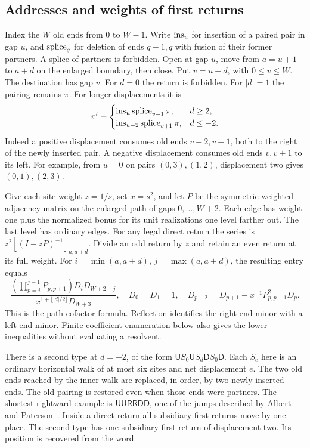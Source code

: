 \documentclass[11pt]{article}
\newcommand{\spc}{\mathop{\rm splice}\nolimits}\newcommand{\ins}{\mathop{\rm ins}\nolimits}
\begin{document}
\subsection{Addresses and weights of first returns}
Index the \(W\) old ends from \(0\) to \(W-1\). Write \(\ins_u\) for insertion of a paired pair in gap \(u\), and \(\spc_q\) for deletion of ends \(q-1,q\) with fusion of their former partners. A splice of partners is forbidden. Open at gap \(u\), move from \(a=u+1\) to \(a+d\) on the enlarged boundary, then close. Put \(v=u+d\), with \(0\le v\le W\). The destination has gap \(v\). For \(d=0\) the return is forbidden. For \(|d|=1\) the pairing remains \(\pi\). For longer displacements it is
\[
 \pi'=\begin{cases}
 \ins_u\spc_{v-1}\pi,&d\ge2,\\
 \ins_{u-2}\spc_{v+1}\pi,&d\le-2 .
 \end{cases}
\]
Indeed a positive displacement consumes old ends \(v-2,v-1\), both to the right of the newly inserted pair. A negative displacement consumes old ends \(v,v+1\) to its left. For example, from \(u=0\) on pairs \((0,3),(1,2)\), displacement two gives \((0,1),(2,3)\).

Give each site weight \(z=1/s\), set \(x=s^2\), and let \(P\) be the symmetric weighted adjacency matrix on the enlarged path of gaps \(0,\ldots,W+2\). Each edge has weight one plus the normalized bonus for its unit realizations one level farther out. The last level has ordinary edges. For any legal direct return the series is \(z^2[(I-zP)^{-1}]_{a,a+d}\). Divide an odd return by \(z\) and retain an even return at its full weight. For \(i=\min(a,a+d)\), \(j=\max(a,a+d)\), the resulting entry equals
\[
 \frac{(\prod_{p=i}^{j-1} P_{p,p+1})D_iD_{W+2-j}}
      {x^{1+\lfloor |d|/2\rfloor} D_{W+3}},\quad
 D_0=D_1=1,\quad D_{p+2}=D_{p+1}-x^{-1}P_{p,p+1}^2D_p .
\]
This is the path cofactor formula. Reflection identifies the right-end minor with a left-end minor. Finite coefficient enumeration below also gives the lower inequalities without evaluating a resolvent.

There is a second type at \(d=\pm2\), of the form \(\mathsf U S_0\mathsf U S_d\mathsf D S_0\mathsf D\). Each \(S_e\) here is an ordinary horizontal walk of at most six sites and net displacement \(e\). The two old ends reached by the inner walk are replaced, in order, by two newly inserted ends. The old pairing is restored even when those ends were partners. The shortest rightward example is \(\mathsf{UURRDD}\), one of the jumps described by Albert and Paterson~\cite{ap,slides}. Inside a direct return all subsidiary first returns move by one place. The second type has one subsidiary first return of displacement two. Its position is recovered from the word.
\end{document}

